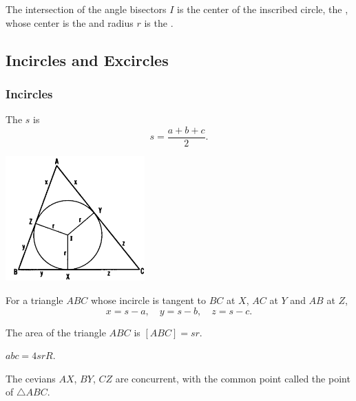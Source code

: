 \documentclass[DIV=12, a4]{scrartcl}
\begin{document}
\begin{definition}
	The intersection of the angle bisectors $I$ is the center of the inscribed circle, the , whose center is the  and radius $r$ is the .
\end{definition}

\subsection{Incircles and Excircles}

\subsubsection{Incircles}

\begin{definition}
	The  $s$ is
	$$
s = \frac{a +b + c}{2}.
$$
\end{definition}

\begin{center}
		\includegraphics[width=0.4\textwidth]{media/1-4A}
\end{center}

\begin{theorem}
For a triangle $ABC$ whose incircle is tangent to $BC$ at $X$, $AC$ at $Y$ and $AB$ at $Z$,
	$$
	x = s - a, \quad y = s - b, \quad z =  s - c.
	$$
\end{theorem}

\begin{theorem}
	The area of the triangle $ABC$ is
	$
	[ABC] = sr.
	$
\end{theorem}

\begin{theorem}
	$
	abc = 4srR.
	$
\end{theorem}


\begin{theorem}
	The cevians $AX$, $BY$, $CZ$ are concurrent, with the common point called the  point of $\triangle ABC$.
\end{theorem}
\end{document}

